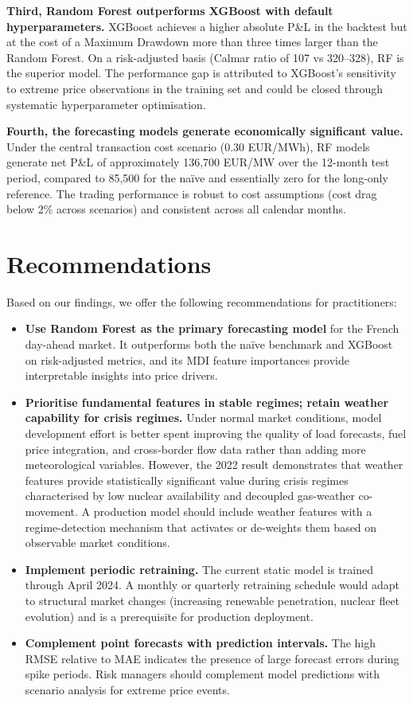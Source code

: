 \textbf{Third, Random Forest outperforms XGBoost with default hyperparameters.} XGBoost achieves a higher absolute P\&L in the backtest but at the cost of a Maximum Drawdown more than three times larger than the Random Forest. On a risk-adjusted basis (Calmar ratio of 107 vs 320--328), RF is the superior model. The performance gap is attributed to XGBoost's sensitivity to extreme price observations in the training set and could be closed through systematic hyperparameter optimisation.

\textbf{Fourth, the forecasting models generate economically significant value.} Under the central transaction cost scenario (0.30 EUR/MWh), RF models generate net P\&L of approximately 136,700 EUR/MW over the 12-month test period, compared to 85,500 for the na\"{i}ve and essentially zero for the long-only reference. The trading performance is robust to cost assumptions (cost drag below 2\% across scenarios) and consistent across all calendar months.

\section{Recommendations}

Based on our findings, we offer the following recommendations for practitioners:

\begin{itemize}
  \item \textbf{Use Random Forest as the primary forecasting model} for the French day-ahead market. It outperforms both the na\"{i}ve benchmark and XGBoost on risk-adjusted metrics, and its MDI feature importances provide interpretable insights into price drivers.

  \item \textbf{Prioritise fundamental features in stable regimes; retain weather capability for crisis regimes.} Under normal market conditions, model development effort is better spent improving the quality of load forecasts, fuel price integration, and cross-border flow data rather than adding more meteorological variables. However, the 2022 result demonstrates that weather features provide statistically significant value during crisis regimes characterised by low nuclear availability and decoupled gas-weather co-movement. A production model should include weather features with a regime-detection mechanism that activates or de-weights them based on observable market conditions.

  \item \textbf{Implement periodic retraining.} The current static model is trained through April 2024. A monthly or quarterly retraining schedule would adapt to structural market changes (increasing renewable penetration, nuclear fleet evolution) and is a prerequisite for production deployment.

  \item \textbf{Complement point forecasts with prediction intervals.} The high RMSE relative to MAE indicates the presence of large forecast errors during spike periods. Risk managers should complement model predictions with scenario analysis for extreme price events.
\end{itemize}

